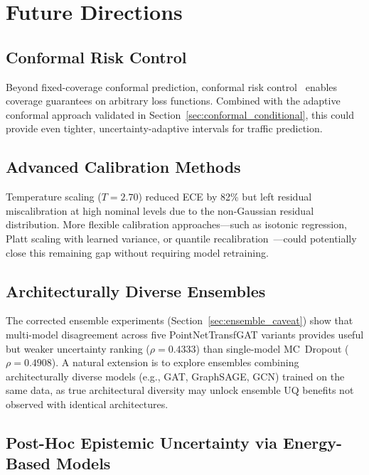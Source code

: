 \section{Future Directions}

\subsection{Conformal Risk Control}

Beyond fixed-coverage conformal prediction, conformal risk control~\cite{angelopoulos2023conformal} enables coverage guarantees on arbitrary loss functions. Combined with the adaptive conformal approach validated in Section~\ref{sec:conformal_conditional}, this could provide even tighter, uncertainty-adaptive intervals for traffic prediction.

\subsection{Advanced Calibration Methods}

Temperature scaling ($T = 2.70$) reduced ECE by 82\% but left residual miscalibration at high nominal levels due to the non-Gaussian residual distribution. More flexible calibration approaches---such as isotonic regression, Platt scaling with learned variance, or quantile recalibration~\cite{kuleshov2018accurate}---could potentially close this remaining gap without requiring model retraining.

\subsection{Architecturally Diverse Ensembles}

The corrected ensemble experiments (Section~\ref{sec:ensemble_caveat}) show that multi-model disagreement across five PointNetTransfGAT variants provides useful but weaker uncertainty ranking ($\rho = 0.4333$) than single-model MC~Dropout ($\rho = 0.4908$).  A natural extension is to explore ensembles combining architecturally diverse models (e.g., GAT, GraphSAGE, GCN) trained on the same data, as true architectural diversity may unlock ensemble UQ benefits not observed with identical architectures.

\subsection{Post-Hoc Epistemic Uncertainty via Energy-Based Models}

